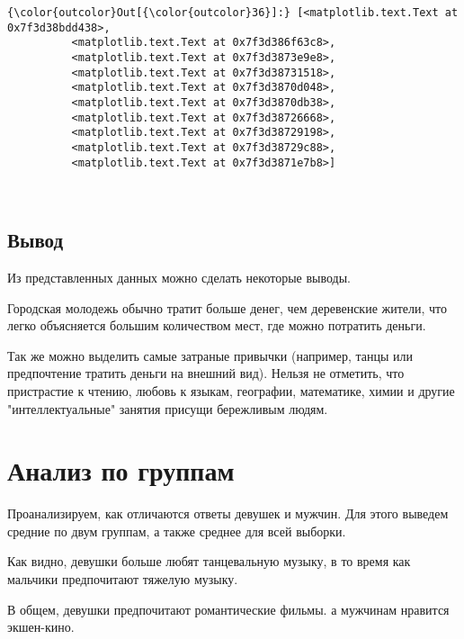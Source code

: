 \documentclass[11pt]{article}
\begin{document}
\begin{Verbatim}[commandchars=\\\{\}]
{\color{outcolor}Out[{\color{outcolor}36}]:} [<matplotlib.text.Text at 0x7f3d38bdd438>,
          <matplotlib.text.Text at 0x7f3d386f63c8>,
          <matplotlib.text.Text at 0x7f3d3873e9e8>,
          <matplotlib.text.Text at 0x7f3d38731518>,
          <matplotlib.text.Text at 0x7f3d3870d048>,
          <matplotlib.text.Text at 0x7f3d3870db38>,
          <matplotlib.text.Text at 0x7f3d38726668>,
          <matplotlib.text.Text at 0x7f3d38729198>,
          <matplotlib.text.Text at 0x7f3d38729c88>,
          <matplotlib.text.Text at 0x7f3d3871e7b8>]
\end{Verbatim}
            
    \begin{center}
    \end{center}
    { \hspace*{\fill} \\}
 
\subsection{Вывод}

Из представленных данных можно сделать некоторые выводы. 

Городская молодежь обычно тратит больше денег, чем деревенские жители, что легко 
объясняется большим количеством мест, где можно потратить деньги. 

Так же можно выделить самые затраные привычки (например, танцы или предпочтение тратить 
деньги на внешний вид).
Нельзя не отметить, что пристрастие к  чтению, любовь к языкам, географии, математике, химии и другие "интеллектуальные" занятия присущи бережливым людям.
    
\section{Анализ по группам}

Проанализируем, как отличаются ответы девушек и мужчин. Для этого выведем средние по двум группам, 
а также среднее для всей выборки. 

Как видно, девушки больше любят танцевальную музыку, в то время как мальчики предпочитают тяжелую музыку.

В общем, девушки предпочитают романтические фильмы. а мужчинам нравится экшен-кино. 
 
\end{document}
